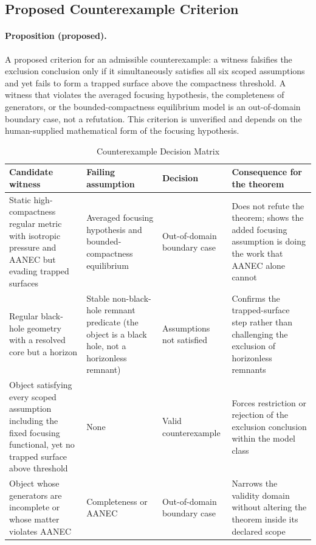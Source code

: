 \documentclass[conference]{IEEEtran}
\begin{document}
\subsection{Proposed Counterexample Criterion}
\paragraph{Proposition (proposed).} A proposed criterion for an admissible counterexample: a witness falsifies the exclusion conclusion only if it simultaneously satisfies all six scoped assumptions and yet fails to form a trapped surface above the compactness threshold. A witness that violates the averaged focusing hypothesis, the completeness of generators, or the bounded-compactness equilibrium model is an out-of-domain boundary case, not a refutation. This criterion is unverified and depends on the human-supplied mathematical form of the focusing hypothesis.

\begin{table}[htbp]
\centering
\footnotesize
\setlength{\tabcolsep}{3pt}
\renewcommand{\arraystretch}{1.12}
\caption{Counterexample Decision Matrix}
\label{tab:forward-derivation-and-counterexamples-fd-matrix}
\begin{tabular}{|p{}|p{}|p{}|p{}|}
\hline
Candidate witness & Failing assumption & Decision & Consequence for the theorem \\\hline
Static high-compactness regular metric with isotropic pressure and AANEC but evading trapped surfaces & Averaged focusing hypothesis and bounded-compactness equilibrium & Out-of-domain boundary case & Does not refute the theorem; shows the added focusing assumption is doing the work that AANEC alone cannot \\\hline
Regular black-hole geometry with a resolved core but a horizon & Stable non-black-hole remnant predicate (the object is a black hole, not a horizonless remnant) & Assumptions not satisfied & Confirms the trapped-surface step rather than challenging the exclusion of horizonless remnants \\\hline
Object satisfying every scoped assumption including the fixed focusing functional, yet no trapped surface above threshold & None & Valid counterexample & Forces restriction or rejection of the exclusion conclusion within the model class \\\hline
Object whose generators are incomplete or whose matter violates AANEC & Completeness or AANEC & Out-of-domain boundary case & Narrows the validity domain without altering the theorem inside its declared scope \\\hline
\end{tabular}
\end{table}
\end{document}
